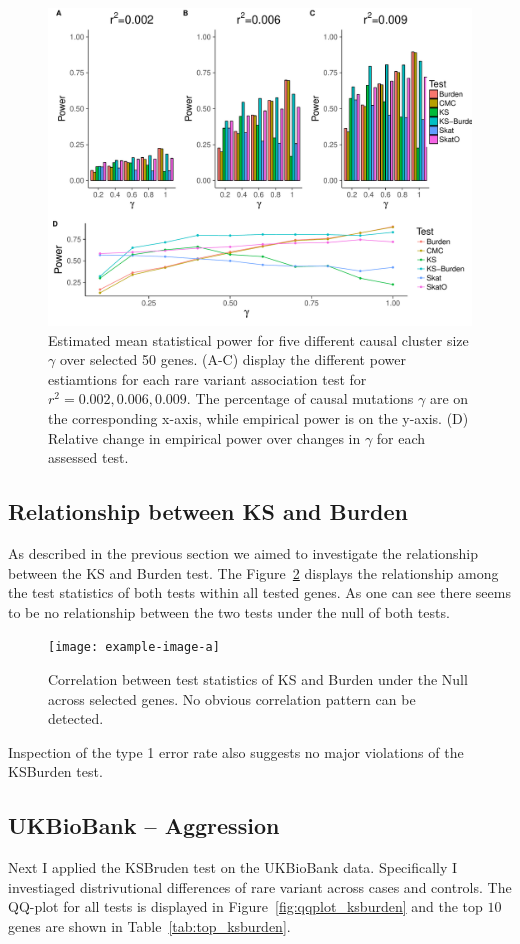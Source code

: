 \begin{figure}[ht!]
  \centering
  \includegraphics[width=0.8\linewidth]{figures/combined_power_analysis.pdf}
  \caption{Estimated mean statistical power for five different causal cluster size $\gamma$ over selected 50 genes.
    (A-C) display the different power estiamtions for each rare variant association test for $r^2=0.002, 0.006, 0.009$.
    The percentage of causal mutations $\gamma$ are on the corresponding x-axis, while empirical power is on the y-axis.
    (D) Relative change in empirical power over changes in $\gamma$ for each assessed test.\label{fig:simulatedGeneRealData}}
\end{figure}

\subsection{Relationship between KS and Burden}
\label{sub:relationship_between_ks_and_burden}

As described in the previous section we aimed to investigate the relationship between the KS and Burden test.
The Figure~\ref{fig:correlation_ks_burden} displays the relationship among the test statistics of both tests within all tested genes.
As one can see there seems to be no relationship between the two tests under the null of both tests.

\begin{figure}[ht!]
  \centering
  \texttt{[image: example-image-a]}
  \caption{Correlation between test statistics of KS and Burden under the Null across selected genes.
    No obvious correlation pattern can be detected.}\label{fig:correlation_ks_burden}
\end{figure}

Inspection of the type 1 error rate also suggests no major violations of the KSBurden test.

\subsection{UKBioBank -- Aggression}
\label{sub:ukbiobank_aggression}

Next I applied the KSBruden test on the UKBioBank data.
Specifically I investiaged distrivutional differences of rare variant across cases and controls.
The QQ-plot for all tests is displayed in Figure~\ref{fig:qqplot_ksburden} and the top $10$ genes are shown in Table~\ref{tab:top_ksburden}.


